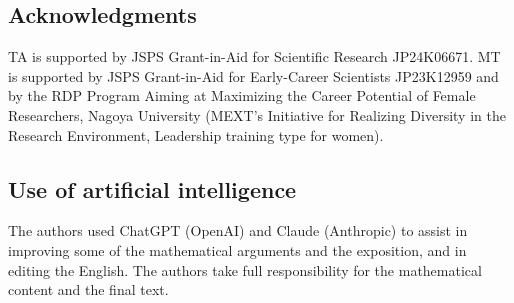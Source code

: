 \documentclass[a4paper,reqno,11pt]{amsart}
\numberwithin{equation}{section}
\theoremstyle{definition}
\begin{document}
\subsection*{Acknowledgments}
TA is supported by JSPS Grant-in-Aid for Scientific Research JP24K06671.
MT is supported by JSPS Grant-in-Aid for Early-Career Scientists JP23K12959 and by the RDP Program Aiming at Maximizing the Career Potential of Female Researchers, Nagoya University (MEXT's Initiative for Realizing Diversity in the Research Environment, Leadership training type for women).

\subsection*{Use of artificial intelligence}
The authors used ChatGPT (OpenAI) and Claude (Anthropic) to assist in improving some of the mathematical arguments and the exposition, and in editing the English. 
The authors take full responsibility for the mathematical content and the final text.
\end{document}
